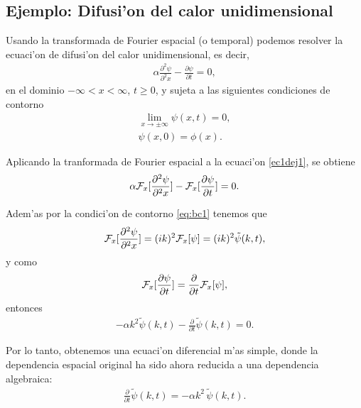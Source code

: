 \subsection{Ejemplo: Difusi'on del calor unidimensional}

Usando la transformada de Fourier espacial (o temporal) podemos resolver la ecuaci'on de difusi'on del calor unidimensional, es decir,
\begin{align}\label{ec1dej1}
\alpha \frac{\partial^2 \psi}{\partial^2 x}-\frac{\partial \psi}{\partial t}=0,
\end{align}
en el dominio $-\infty<x<\infty$, $t\ge 0$, y sujeta a las siguientes condiciones de contorno
\begin{align}
\lim_{x \rightarrow \pm \infty}\psi(x,t)=0,\label{eq:bc1}\\
\psi(x,0)=\phi(x).\label{eq:bc2}
\end{align}

Aplicando la tranformada de Fourier espacial a la ecuaci'on \eqref{ec1dej1}, se obtiene
\begin{align}
\alpha {\cal F}_{x}[\frac{\partial^2 \psi}{\partial^2 x}]-{\cal F}_{x}[\frac{\partial \psi}{\partial t}]=0.
\end{align}

Adem'as por la condici'on de contorno \eqref{eq:bc1} tenemos que
\begin{align}
{\cal F}_{x}[\frac{\partial^2 \psi}{\partial^2 x}]=(i k)^2 {\cal F}_{x}[\psi]=(i k)^2 \tilde{\psi}(k,t),
\end{align}
y como
\begin{align}
{\cal F}_{x}[\frac{\partial \psi}{\partial t}]=\frac{\partial}{\partial t}{\cal F}_{x}[\psi],
\end{align}
entonces
\begin{align}
-\alpha k^2 \tilde{\psi}(k,t)-\frac{\partial}{\partial t}\tilde{\psi}(k,t)=0.
\end{align}

Por lo tanto, obtenemos una ecuaci'on diferencial m'as simple, donde la dependencia espacial original ha sido ahora reducida a una dependencia algebraica:
\begin{align}
\frac{\partial}{\partial t}\tilde{\psi}(k,t)=-\alpha k^2\, \tilde{\psi}(k,t).
\end{align}

